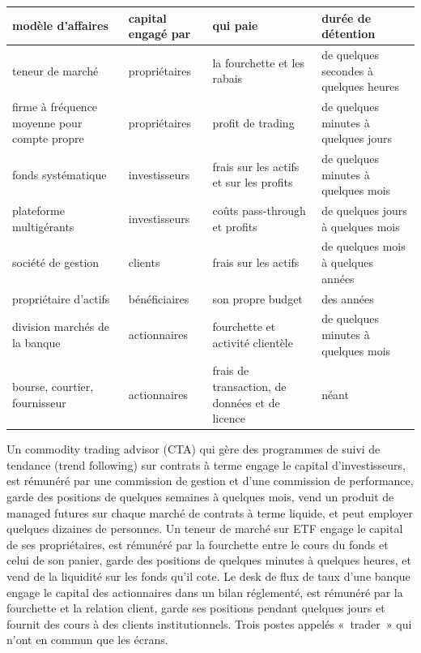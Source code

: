 \begin{center}\small
\begin{tabular}{@{}>{\raggedright\arraybackslash}p{2.7cm}>{\raggedright\arraybackslash}p{2.5cm}>{\raggedright\arraybackslash}p{4.0cm}>{\raggedright\arraybackslash}p{3.4cm}@{}}
\toprule
modèle d'affaires & capital engagé par & qui paie & durée de détention\\
\midrule
teneur de marché & propriétaires & la fourchette et les rabais & de quelques secondes à quelques heures\\
firme à fréquence moyenne pour compte propre & propriétaires & profit de trading & de quelques minutes à quelques jours\\
fonds systématique & investisseurs & frais sur les actifs et sur les profits & de quelques minutes à quelques mois\\
plateforme multigérants & investisseurs & coûts pass-through et profits & de quelques jours à quelques mois\\
société de gestion & clients & frais sur les actifs & de quelques mois à quelques années\\
propriétaire d'actifs & bénéficiaires & son propre budget & des années\\
division marchés de la banque & actionnaires & fourchette et activité clientèle & de quelques minutes à quelques mois\\
bourse, courtier, fournisseur & actionnaires & frais de transaction, de données et de licence & néant\\
\bottomrule
\end{tabular}
\end{center}

\begin{example}\label{ex:in:a-map-of-the-industry:three}
Un commodity trading advisor (CTA) qui gère des programmes de suivi de tendance (trend following) sur contrats à terme engage le capital d'investisseurs, est rémunéré par une commission de gestion
et d'une commission de performance, garde des positions de quelques semaines à quelques mois, vend un produit de managed futures sur chaque marché de contrats à terme
liquide, et peut employer quelques dizaines de personnes. Un teneur de marché sur ETF engage le capital de ses propriétaires, est rémunéré par
la fourchette entre le cours du fonds et celui de son panier, garde des positions de quelques minutes à quelques heures, et vend de la liquidité
sur les fonds qu'il cote. Le desk de flux de taux d'une banque engage le capital des actionnaires dans un bilan réglementé, est rémunéré
par la fourchette et la relation client, garde ses positions pendant quelques jours et fournit des cours à des clients institutionnels. Trois
postes appelés «~trader~» qui n'ont en commun que les écrans.
\end{example}

